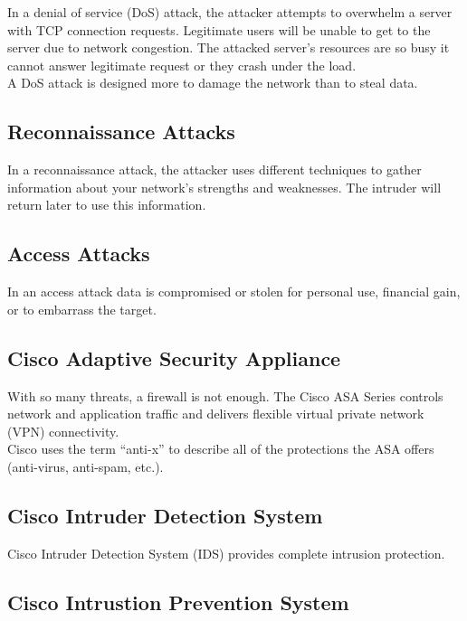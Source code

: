 In a denial of service (DoS) attack, the attacker attempts to overwhelm a
server with TCP connection requests. Legitimate users will be unable to get to
the server due to network congestion. The attacked server's resources are so
busy it cannot answer legitimate request or they crash under the load.\\

A DoS attack is designed more to damage the network than to steal data.

\subsection{Reconnaissance Attacks}

In a reconnaissance attack, the attacker uses different techniques to gather
information about your network's strengths and weaknesses. The intruder will
return later to use this information.

\subsection{Access Attacks}

In an access attack data is compromised or stolen for personal use, financial
gain, or to embarrass the target.

\subsection{Cisco Adaptive Security Appliance}

With so many threats, a firewall is not enough. The Cisco ASA Series controls
network and application traffic and delivers flexible virtual private network
(VPN) connectivity.\\

Cisco uses the term ``anti-x'' to describe all of the protections the ASA
offers (anti-virus, anti-spam, etc.).

\subsection{Cisco Intruder Detection System}

Cisco Intruder Detection System (IDS) provides complete intrusion protection.

\subsection{Cisco Intrustion Prevention System}

